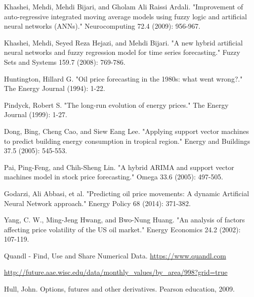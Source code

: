 \documentclass[runningheads]{llncs}
\begin{document}
\begin{thebibliography}{4}
Khashei, Mehdi, Mehdi Bijari, and Gholam Ali Raissi Ardali. "Improvement of auto-regressive integrated moving average models using fuzzy logic and artificial neural networks (ANNs)." Neurocomputing 72.4 (2009): 956-967.

Khashei, Mehdi, Seyed Reza Hejazi, and Mehdi Bijari. "A new hybrid artificial neural networks and fuzzy regression model for time series forecasting." Fuzzy Sets and Systems 159.7 (2008): 769-786.

 Huntington, Hillard G. "Oil price forecasting in the 1980s: what went wrong?." The Energy Journal (1994): 1-22.

 Pindyck, Robert S. "The long-run evolution of energy prices." The Energy Journal (1999): 1-27.

 Dong, Bing, Cheng Cao, and Siew Eang Lee. "Applying support vector machines to predict building energy consumption in tropical region." Energy and Buildings 37.5 (2005): 545-553.

 Pai, Ping-Feng, and Chih-Sheng Lin. "A hybrid ARIMA and support vector machines model in stock price forecasting." Omega 33.6 (2005): 497-505.

 Godarzi, Ali Abbasi, et al. "Predicting oil price movements: A dynamic Artificial Neural Network approach." Energy Policy 68 (2014): 371-382.

 Yang, C. W., Ming-Jeng Hwang, and Bwo-Nung Huang. "An analysis of factors affecting price volatility of the US oil market." Energy Economics 24.2 (2002): 107-119.

 Quandl - Find, Use and Share Numerical Data. \url{https://www.quandl.com}

\url{http://future.aae.wisc.edu/data/monthly_values/by_area/998?grid=true}

 Hull, John. Options, futures and other derivatives. Pearson education, 2009.

\end{thebibliography}
\end{document}
